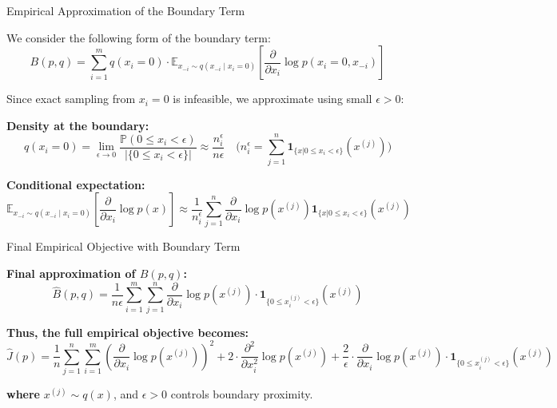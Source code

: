 \documentclass[aspectratio=169]{beamer}
\begin{document}
\begin{frame}{Empirical Approximation of the Boundary Term}

We consider the following form of the boundary term:
\[
B(p, q) = \sum_{i=1}^m q(x_i = 0) \cdot \mathbb{E}_{x_{-i} \sim q(x_{-i} \mid x_i = 0)}
\left[ \frac{\partial}{\partial x_i} \log p(x_i=0, x_{-i}) \right]
\]

Since exact sampling from \( x_i = 0 \) is infeasible, we approximate using small \( \epsilon > 0 \):

\vspace{1em}

\textbf{Density at the boundary:}
\[
q(x_i = 0) = \lim_{\epsilon \rightarrow 0} \frac{\mathbb{P}(0 \leq x_i < \epsilon)}{\big|\{0 \leq x_i < \epsilon\}\big|}  
\approx \frac{n_i^\epsilon}{n \epsilon}
\quad \Big(n_i^\epsilon = \sum_{j = 1}^n \mathbf{1}_{\{x|0 \leq x_i < \epsilon\}}(x^{(j)})\Big)
\]

\textbf{Conditional expectation:}
\[
\mathbb{E}_{x_{-i} \sim q(x_{-i} \mid x_i = 0)} \left[ \frac{\partial}{\partial x_i} \log p(x) \right]
\approx \frac{1}{n_i^\epsilon} \sum_{j=1}^n 
\frac{\partial}{\partial x_i} \log p(x^{(j)})\mathbf{1}_{\{x|0 \leq x_i < \epsilon\}}(x^{(j)})
\]

\end{frame}
\begin{frame}{Final Empirical Objective with Boundary Term}

\textbf{Final approximation of \( B(p, q) \):}
\[
\hat{B}(p, q) 
= \frac{1}{n \epsilon} \sum_{i=1}^m \sum_{j=1}^n 
\frac{\partial}{\partial x_i} \log p(x^{(j)}) 
\cdot \mathbf{1}_{\{0 \leq x_i^{(j)} < \epsilon\}}(x^{(j)})
\]

\vspace{1em}

\textbf{Thus, the full empirical objective becomes:}
\[
\hat{J}(p) 
= \frac{1}{n} \sum_{j=1}^n \sum_{i=1}^m 
\left( \frac{\partial}{\partial x_i} \log p(x^{(j)}) \right)^2
+ 2 \cdot \frac{\partial^2}{\partial x_i^2} \log p(x^{(j)})
+ \frac{2}{\epsilon} \cdot \frac{\partial}{\partial x_i} \log p(x^{(j)}) 
\cdot \mathbf{1}_{\{0 \leq x_i^{(j)} < \epsilon\}}(x^{(j)})
\]

\vspace{0.5em}
\textbf{where } \( x^{(j)} \sim q(x) \), and \( \epsilon > 0 \) controls boundary proximity.

\end{frame}
\end{document}

